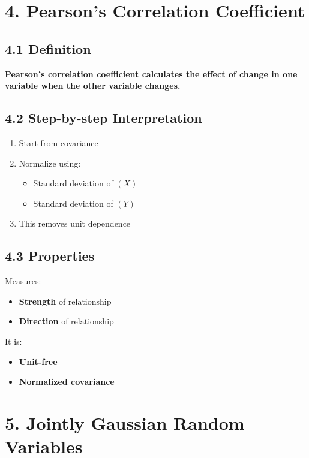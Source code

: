 \documentclass[12pt]{article}
\begin{document}
\section*{4. Pearson’s Correlation Coefficient}

\subsection*{4.1 Definition}

\textbf{Pearson’s correlation coefficient calculates the effect of change in one variable when the other variable changes.}

\subsection*{4.2 Step-by-step Interpretation}

\begin{enumerate}
\item Start from covariance
\item Normalize using:
\begin{itemize}
\item Standard deviation of $(X)$
\item Standard deviation of $(Y)$
\end{itemize}
\item This removes unit dependence
\end{enumerate}

\subsection*{4.3 Properties}

Measures:
\begin{itemize}
\item \textbf{Strength} of relationship
\item \textbf{Direction} of relationship
\end{itemize}

It is:
\begin{itemize}
\item \textbf{Unit-free}
\item \textbf{Normalized covariance}
\end{itemize}

\section*{5. Jointly Gaussian Random Variables}
\end{document}
